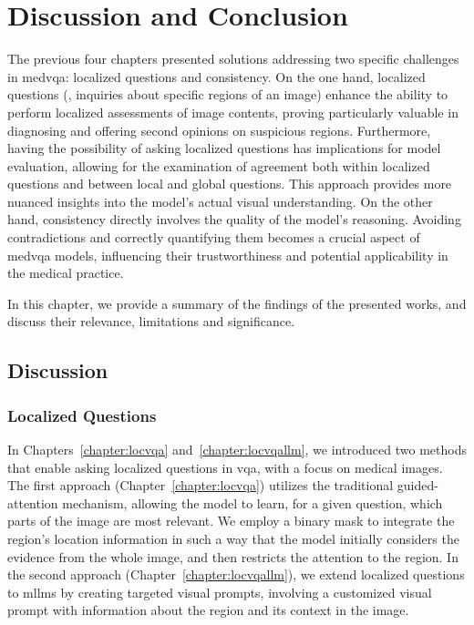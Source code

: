 \chapter{Discussion and Conclusion}
\label{chapter:discussion_conclusion}

The previous four chapters presented solutions addressing two specific challenges in \gls{medvqa}: localized questions and consistency. On the one hand, localized questions (\ie, inquiries about specific regions of an image) enhance the ability to perform localized assessments of image contents, proving particularly valuable in diagnosing and offering second opinions on suspicious regions. Furthermore, having the possibility of asking localized questions has implications for model evaluation, allowing for the examination of agreement both within localized questions and between local and global questions. This approach provides more nuanced insights into the model's actual visual understanding. On the other hand, consistency directly involves the quality of the model's reasoning. Avoiding contradictions and correctly quantifying them becomes a crucial aspect of \gls{medvqa} models, influencing their trustworthiness and potential applicability in the medical practice. 

In this chapter, we provide a summary of the findings of the presented works, and discuss their relevance, limitations and significance.

\newpage


\section{Discussion}

\subsection{Localized Questions}

In Chapters~\ref{chapter:locvqa} and~\ref{chapter:locvqallm}, we introduced two methods that enable asking localized questions in \gls{vqa}, with a focus on medical images. The first approach (Chapter~\ref{chapter:locvqa}) utilizes the traditional guided-attention mechanism, allowing the model to learn, for a given question, which parts of the image are most relevant. We employ a binary mask to integrate the region's location information in such a way that the model initially considers the evidence from the whole image, and then restricts the attention to the region. In the second approach (Chapter~\ref{chapter:locvqallm}), we extend localized questions to \glspl{mllm} by creating targeted visual prompts, involving a customized visual prompt with information about the region and its context in the image. 

